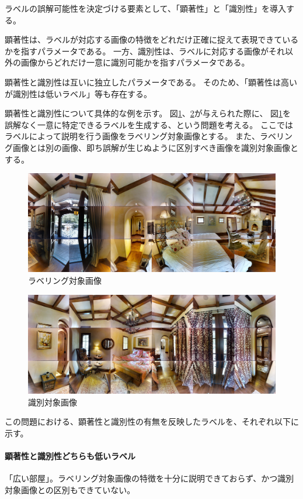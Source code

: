 \documentclass[a4paper,11pt]{jreport}
\begin{document}
ラベルの誤解可能性を決定づける要素として、「顕著性」と「識別性」を導入する。

顕著性は、ラベルが対応する画像の特徴をどれだけ正確に捉えて表現できているかを指すパラメータである。
一方、識別性は、ラベルに対応する画像がそれ以外の画像からどれだけ一意に識別可能かを指すパラメータである。

顕著性と識別性は互いに独立したパラメータである。
そのため、「顕著性は高いが識別性は低いラベル」等も存在する。

顕著性と識別性について具体的な例を示す。
図\ref{fig:white_bed}、\ref*{fig:pink_bed}が与えられた際に、
図\ref{fig:white_bed}を誤解なく一意に特定できるラベルを生成する、という問題を考える。
ここではラベルによって説明を行う画像をラベリング対象画像とする。
また、ラベリング画像とは別の画像、即ち誤解が生じぬように区別すべき画像を識別対象画像とする。

\begin{figure}[H]
	\centering
	\includegraphics[width=0.8\linewidth]{figures/3-2_white_bed.jpg}
	\caption{ラベリング対象画像}
	\label{fig:white_bed}
\end{figure}

\begin{figure}[H]
	\centering
	\includegraphics[width=0.8\linewidth]{figures/3-2_pink_bed.jpg}
	\caption{識別対象画像}
	\label{fig:pink_bed}
\end{figure}

この問題における、顕著性と識別性の有無を反映したラベルを、それぞれ以下に示す。

\paragraph*{顕著性と識別性どちらも低いラベル}
「広い部屋」。ラベリング対象画像の特徴を十分に説明できておらず、かつ識別対象画像との区別もできていない。
\end{document}
